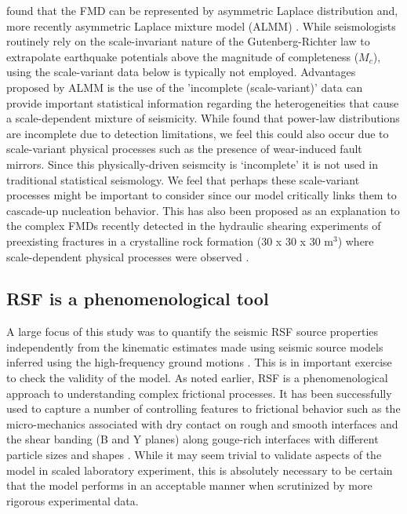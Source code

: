 \documentclass[preprint,1p, 10pt,authoryear]{elsarticle}
\begin{document}
\citet{Mignan2012} found that the FMD can be represented by asymmetric Laplace distribution and, more recently asymmetric Laplace mixture model (ALMM) \citet{Mignan2020}. While seismologists routinely rely on the scale-invariant nature of the Gutenberg-Richter law to extrapolate earthquake potentials above the magnitude of completeness ($M_{c}$), using the scale-variant data below is typically not employed. Advantages proposed by ALMM is the use of the 'incomplete (scale-variant)' data can provide important statistical information regarding the heterogeneities that cause a scale-dependent mixture of seismicity. While \citet{Mignan2020} found that power-law distributions are incomplete due to detection limitations, we feel this could also occur due to scale-variant physical processes such as the presence of wear-induced fault mirrors. Since this physically-driven seismcity is `incomplete' it is not used in traditional statistical seismology. We feel that perhaps these scale-variant processes might be important to consider since our model critically links them to cascade-up nucleation behavior. This has also been proposed as an explanation to the complex FMDs recently detected in the hydraulic shearing experiments of preexisting fractures in a crystalline rock formation (30 x 30 x 30 m$^{3}$) where scale-dependent physical processes were observed \citep{Villiger2019}.

\subsection{RSF is a phenomenological tool}
A large focus of this study was to quantify the seismic RSF source properties independently from the kinematic estimates made using seismic source models inferred using the high-frequency ground motions \citep{Selvadurai2019}. This is in important exercise to check the validity of the model. As noted earlier, RSF is a phenomenological approach to understanding complex frictional processes.  It has been successfully used to capture a number of controlling features to frictional behavior such as the micro-mechanics associated with dry contact on rough and smooth interfaces \citep{Marone1998,Yoshioka1997} and the shear banding (B and Y planes) along gouge-rich interfaces with different particle sizes and shapes \citep{Marone1993, Anthony2005,Scuderi2017}. While it may seem trivial to validate aspects of the model in scaled laboratory experiment, this is absolutely necessary to be certain that the model performs in an acceptable manner when scrutinized by more rigorous experimental data.
\end{document}
